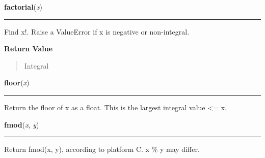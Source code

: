 \hspace{.8\funcindent}\begin{boxedminipage}{\funcwidth}

    \raggedright \textbf{factorial}(\textit{x})

    \vspace{-1.5ex}

    \rule{\textwidth}{0.5\fboxrule}
\setlength{\parskip}{2ex}
    Find x!. Raise a ValueError if x is negative or non-integral.

\setlength{\parskip}{1ex}
      \textbf{Return Value}
    \vspace{-1ex}

      \begin{quote}
      Integral

      \end{quote}

    \end{boxedminipage}

    \label{math:floor}

    \vspace{0.5ex}

\hspace{.8\funcindent}\begin{boxedminipage}{\funcwidth}

    \raggedright \textbf{floor}(\textit{x})

    \vspace{-1.5ex}

    \rule{\textwidth}{0.5\fboxrule}
\setlength{\parskip}{2ex}
    Return the floor of x as a float. This is the largest integral value 
    {\textless}= x.

\setlength{\parskip}{1ex}
    \end{boxedminipage}

    \label{math:fmod}

    \vspace{0.5ex}

\hspace{.8\funcindent}\begin{boxedminipage}{\funcwidth}

    \raggedright \textbf{fmod}(\textit{x}, \textit{y})

    \vspace{-1.5ex}

    \rule{\textwidth}{0.5\fboxrule}
\setlength{\parskip}{2ex}
    Return fmod(x, y), according to platform C.  x \% y may differ.

\setlength{\parskip}{1ex}
    \end{boxedminipage}

